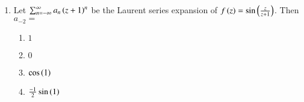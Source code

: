 \documentclass[journal]{IEEEtran}
\begin{document}
\begin{enumerate}
{\begin{multicols}{4}
\begin{enumerate}
\end{enumerate}
\end{multicols}
}
\item{
Let $\sum_{n=-\infty}^\infty a_n\left(z+1\right)^n$ be the Laurent series expansion of $f\left(z\right)=\sin\left(\frac{z}{z+1}\right)$. Then $a_{-2}=$
\begin{multicols}{4}
\begin{enumerate}
\item $1$
\item $0$
\item $\cos\left(1\right)$
\item $\frac{-1}{2}\sin\left(1\right)$
\end{enumerate}
\end{multicols}
}
\end{enumerate}
\end{document}
